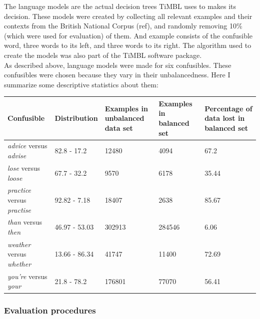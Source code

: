 \documentclass[12pt]{article}
\begin{document}
The language models are the actual decision trees TiMBL uses to makes its decision. These models were created by collecting all relevant examples and their contexts from the British National Corpus (ref), and randomly removing 10\% (which were used for evaluation) of them. And example consists of the confusible word, three words to its left, and three words to its right. The algorithm used to create the models was also part of the TiMBL software package.\\\indent
As described above, language models were made for six confusibles. These confusibles were chosen because they vary in their unbalancedness. Here I summarize some descriptive statistics about them:


\begin{table}[h] \footnotesize
\begin{tabular}{|l|l|p{3cm}|l|p{3cm}|}
\hline
Confusible&Distribution&Examples in unbalanced data set&Examples in balanced set&Percentage of data lost in balanced set\\
\hline
\emph{advice} versus \emph{advise}&82.8 - 17.2&12480&4094&67.2\\
\emph{lose} versus \emph{loose}&67.7 - 32.2&9570&6178&35.44\\
\emph{practice} versus \emph{practise}&92.82 - 7.18&18407&2638&85.67\\
\emph{than} versus \emph{then}&46.97 - 53.03&302913&284546&6.06\\
\emph{weather} versus \emph{whether}&13.66 - 86.34&41747&11400&72.69\\
\emph{you're} versus \emph{your}&21.8 - 78.2&176801&77070&56.41\\
\hline
\end{tabular}
\end{table}

\subsubsection{Evaluation procedures} \label{eval}
\end{document}
